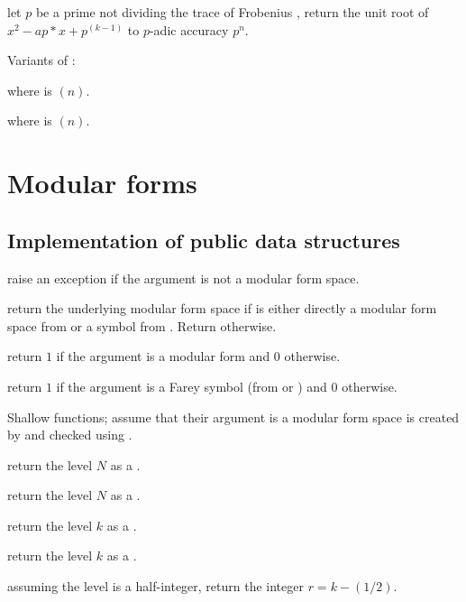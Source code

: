 let $p$ be a prime not dividing the trace of Frobenius ,
return the unit root of $x^2 - ap*x + p^(k-1)$ to $p$-adic accuracy $p^n$.

Variants of  :


 where  is $(n)$.

 where  is $(n)$.

\chapter{Modular forms}

\section{Implementation of public data structures}

 raise an exception if the argument is not a
modular form space.

 return the underlying modular form space
if  is either directly a modular form space from 
or a symbol from . Return  otherwise.

 return $1$ if the argument is a modular form
and $0$ otherwise.

 return $1$ if the argument is a Farey symbol
(from  or ) and $0$ otherwise.


Shallow functions; assume that their argument is a modular form space
is created by  and checked using .

 return the level $N$ as a .

 return the level $N$ as a .

 return the level $k$ as a .

 return the level $k$ as a .

 assuming the level is a half-integer, return
the integer $r = k - (1/2)$.

